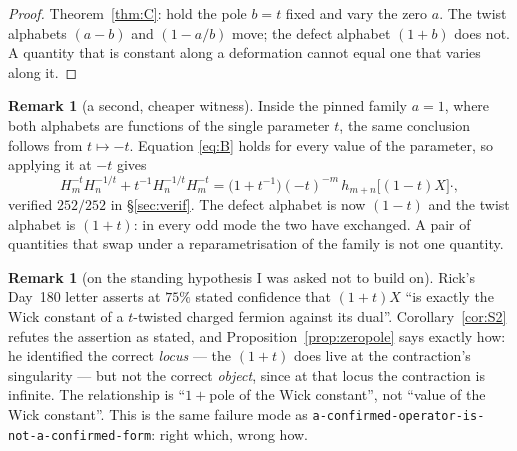 \documentclass[11pt]{article}
\theoremstyle{definition}
\newtheorem{remark}[theorem]{Remark}
\newcommand{\Hop}{H}
\begin{document}
\begin{proof}
Theorem~\ref{thm:C}: hold the pole $b=t$ fixed and vary the zero $a$.  The twist alphabets
$(a-b)$ and $(1-a/b)$ move; the defect alphabet $(1+b)$ does not.  A quantity that is
constant along a deformation cannot equal one that varies along it.
\end{proof}

\begin{remark}[a second, cheaper witness]\label{rem:tminus}
Inside the pinned family $a=1$, where both alphabets are functions of the single parameter
$t$, the same conclusion follows from $t\mapsto-t$.  Equation \eqref{eq:B} holds for every
value of the parameter, so applying it at $-t$ gives
\[
  \Hop^{-t}_m\Hop^{-1/t}_n+t^{-1}\Hop^{-1/t}_n\Hop^{-t}_m
  =\bigl(1+t^{-1}\bigr)(-t)^{-m}\,h_{m+n}\bigl[(1-t)X\bigr]\cdot,
\]
verified $252/252$ in \S\ref{sec:verif}.  The defect alphabet is now $(1-t)$ and the twist
alphabet is $(1+t)$: in every odd mode the two have exchanged.  A pair of quantities that
swap under a reparametrisation of the family is not one quantity.
\end{remark}

\begin{remark}[on the standing hypothesis I was asked not to build on]
Rick's Day~180 letter asserts at $75\%$ stated confidence that $(1+t)X$ ``is exactly the
Wick constant of a $t$-twisted charged fermion against its dual''.  Corollary~\ref{cor:S2}
refutes the assertion as stated, and Proposition~\ref{prop:zeropole} says exactly how: he
identified the correct \emph{locus} --- the $(1+t)$ does live at the contraction's
singularity --- but not the correct \emph{object}, since at that locus the contraction is
infinite.  The relationship is ``$1+{}$pole of the Wick constant'', not ``value of the Wick
constant''.  This is the same failure mode as
\texttt{a-confirmed-operator-is-not-a-confirmed-form}: right which, wrong how.
\end{remark}
\end{document}
